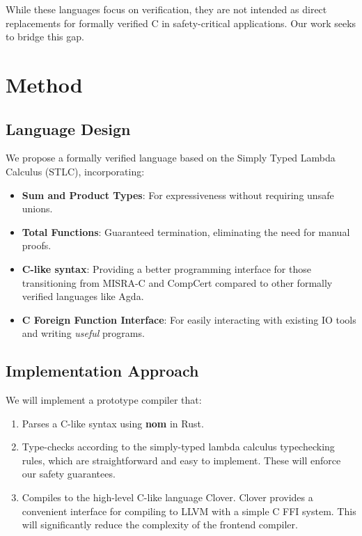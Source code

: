 \documentclass[conference]{IEEEtran}
\begin{document}
While these languages focus on verification, they are not intended as direct replacements for formally verified C in safety-critical applications. Our work seeks to bridge this gap.

\section{Method}

\subsection{Language Design}
We propose a formally verified language based on the Simply Typed Lambda Calculus (STLC), incorporating:

\begin{itemize}
    \item \textbf{Sum and Product Types}: For expressiveness without requiring unsafe unions.
    \item \textbf{Total Functions}: Guaranteed termination, eliminating the need for manual proofs.
    \item \textbf{C-like syntax}: Providing a better programming interface for those transitioning from MISRA-C and CompCert compared to other formally verified languages like Agda.
    \item \textbf{C Foreign Function Interface}: For easily interacting with existing IO tools and writing \emph{useful} programs.
\end{itemize}

\subsection{Implementation Approach}

We will implement a prototype compiler that:

\begin{enumerate}
    \item Parses a C-like syntax using \textbf{nom} in Rust.
    \item Type-checks according to the simply-typed lambda calculus typechecking rules, which are straightforward and easy to implement. These will enforce our safety guarantees.
    \item Compiles to the high-level C-like language Clover. Clover provides a convenient interface for compiling to LLVM with a simple C FFI system. This will significantly reduce the complexity of the frontend compiler.
\end{enumerate}
\end{document}

